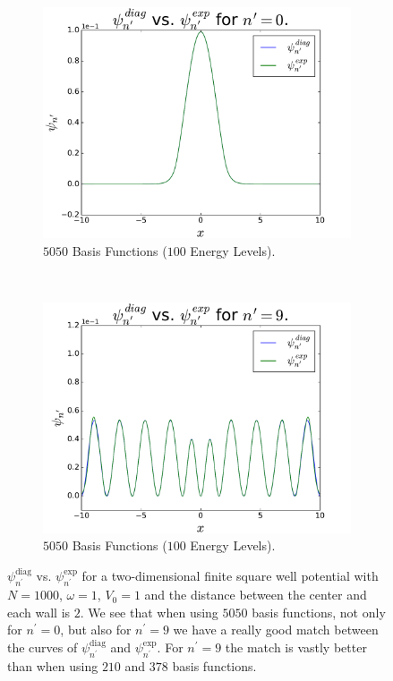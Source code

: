 \documentclass[../main.tex]{subfiles}
\begin{document}
\begin{figure}
    \centering
    \begin{subfigure}{0.5\textwidth}
        \centering
        \includegraphics[scale=0.4]{figures/psiComp/psiCompSquare_nPrime0_BF5050}
        \caption{$5050$ Basis Functions ($100$ Energy Levels).}
        \label{fig:nPrime0aSquare100}
    \end{subfigure}%
    ~ 
    \begin{subfigure}{0.5\textwidth}
        \centering
        \includegraphics[scale=0.4]{figures/psiComp/psiCompSquare_nPrime9_BF5050}
        \caption{$5050$ Basis Functions ($100$ Energy Levels).}
        \label{fig:nPrime9bSquare100}
    \end{subfigure}
    \caption{$\psi_{n^\prime}^\textrm{diag}$ vs. $\psi_{n^\prime}^\textrm{exp}$ for a two-dimensional finite square well potential with $N=1000$, $\omega = 1$, $V_0 = 1$ and the distance between the center and each wall is $2$. We see that when using $5050$ basis functions, not only for $n^\prime = 0$, but also for $n^\prime = 9$ we have a really good match between the curves of $\psi_{n^\prime}^\textrm{diag}$ and $\psi_{n^\prime}^\textrm{exp}$. For $n^\prime = 9$ the match is vastly better than when using $210$ and $378$ basis functions.}
    \label{fig:nPrime0Square100}
\end{figure}
\end{document}

